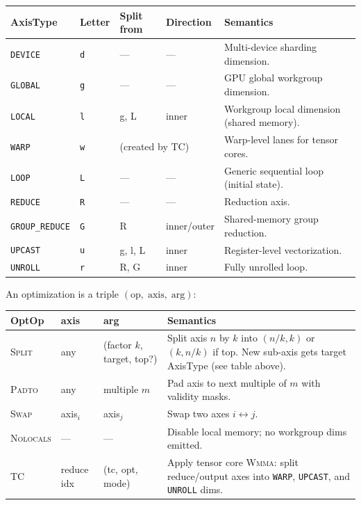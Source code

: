 \documentclass[10pt,letterpaper]{article}
\newcommand{\op}[1]{\textsc{#1}}
\begin{document}
\medskip
\begin{tabular}{@{}l l l l l@{}}
\toprule
\textbf{AxisType} & \textbf{Letter} & \textbf{Split from} & \textbf{Direction} & \textbf{Semantics} \\
\midrule
{\color{axgreen}\texttt{DEVICE}} & \texttt{d} & --- & --- & Multi-device sharding dimension. \\
{\color{axblue}\texttt{GLOBAL}} & \texttt{g} & --- & --- & GPU global workgroup dimension. \\
{\color{axcyan}\texttt{LOCAL}} & \texttt{l} & g, L & inner & Workgroup local dimension (shared memory). \\
{\color{axbrcyan}\texttt{WARP}} & \texttt{w} & \multicolumn{2}{l}{(created by \op{TC})} & Warp-level lanes for tensor cores. \\
{\color{axwhite}\texttt{LOOP}} & \texttt{L} & --- & --- & Generic sequential loop (initial state). \\
{\color{axred}\texttt{REDUCE}} & \texttt{R} & --- & --- & Reduction axis. \\
{\color{axbrred}\texttt{GROUP\_REDUCE}} & \texttt{G} & R & inner/outer & Shared-memory group reduction. \\
{\color{axyellow}\texttt{UPCAST}} & \texttt{u} & g, l, L & inner & Register-level vectorization. \\
{\color{axmagenta}\texttt{UNROLL}} & \texttt{r} & R, G & inner & Fully unrolled loop. \\
\bottomrule
\end{tabular}

\medskip
An optimization is a triple $(\mathrm{op},\;\mathrm{axis},\;\mathrm{arg})$:

\smallskip
\begin{tabular}{@{}l l l p{6.5cm}@{}}
\toprule
\textbf{OptOp} & \textbf{axis} & \textbf{arg} & \textbf{Semantics} \\
\midrule
\op{Split} & any & (factor $k$, target, top?) &
  Split axis $n$ by $k$ into $(n/k, k)$ or $(k, n/k)$ if top. New sub-axis gets target AxisType (see table above). \\
\op{Padto} & any & multiple $m$ &
  Pad axis to next multiple of $m$ with validity masks. \\[4pt]
\op{Swap} & axis$_i$ & axis$_j$ &
  Swap two axes $i \leftrightarrow j$. \\
\op{Nolocals} & --- & --- &
  Disable local memory; no workgroup dims emitted. \\
\op{TC} & reduce idx & (tc, opt, mode) &
  Apply tensor core \op{Wmma}: split reduce/output axes into \texttt{WARP}, \texttt{UPCAST}, and \texttt{UNROLL} dims. \\
\bottomrule
\end{tabular}
\end{document}
